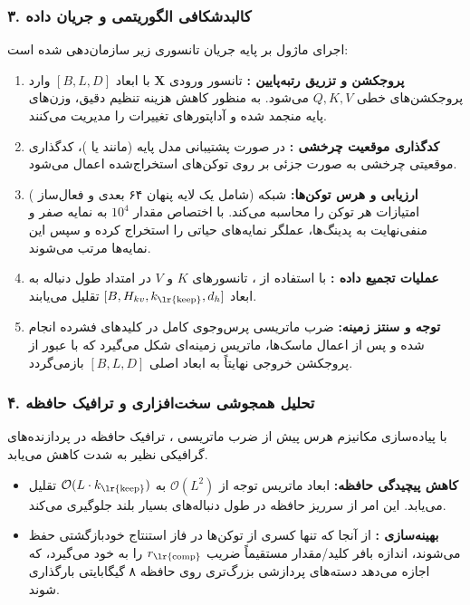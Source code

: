 \subsubsection*{۳. کالبدشکافی الگوریتمی و جریان داده }
اجرای ماژول  بر پایه جریان تانسوری زیر سازمان‌دهی شده است:
\begin{enumerate}
    \item \textbf{پروجکشن و تزریق رتبه‌پایین :} تانسور ورودی $\mathbf{X}$ با ابعاد $[B, L, D]$ وارد پروجکشن‌های خطی $Q, K, V$ می‌شود. به منظور کاهش هزینه تنظیم دقیق، وزن‌های پایه منجمد شده و آداپتورهای  تغییرات را مدیریت می‌کنند.
    \item \textbf{کدگذاری موقعیت چرخشی :} در صورت پشتیبانی مدل پایه (مانند  یا )، کدگذاری موقعیتی چرخشی به صورت جزئی بر روی توکن‌های استخراج‌شده اعمال می‌شود.
    \item \textbf{ارزیابی و هرس توکن‌ها:} شبکه  (شامل یک لایه پنهان ۶۴ بعدی و فعال‌ساز ) امتیازات هر توکن را محاسبه می‌کند. با اختصاص مقدار $10^4$ به نمایه صفر و منفی‌نهایت به پدینگ‌ها، عملگر  نمایه‌های حیاتی را استخراج کرده و سپس این نمایه‌ها مرتب می‌شوند.
    \item \textbf{عملیات تجميع داده :} با استفاده از ، تانسورهای $K$ و $V$ در امتداد طول دنباله به ابعاد $[B, H_{kv}, k_{\text{\lr{keep}}}, d_h]$ تقلیل می‌یابند.
    \item \textbf{توجه و سنتز زمینه:} ضرب ماتریسی پرس‌وجوی کامل در کلیدهای فشرده انجام شده و پس از اعمال ماسک‌ها، ماتریس زمینه‌ای شکل می‌گیرد که با عبور از پروجکشن خروجی نهایتاً به ابعاد اصلی $[B, L, D]$ بازمی‌گردد.
\end{enumerate}

\subsubsection*{۴. تحلیل همجوشی سخت‌افزاری و ترافیک حافظه }
با پیاده‌سازی مکانیزم هرس پیش از ضرب ماتریسی ، ترافیک حافظه  در پردازنده‌های گرافیکی نظیر  به شدت کاهش می‌یابد. 
\begin{itemize}
    \item \textbf{کاهش پیچیدگی حافظه:} ابعاد ماتریس توجه از $\mathcal{O}(L^2)$ به $\mathcal{O}(L \cdot k_{\text{\lr{keep}}})$ تقلیل می‌یابد. این امر از سرریز حافظه  در طول دنباله‌های بسیار بلند جلوگیری می‌کند.
    \item \textbf{بهینه‌سازی :} از آنجا که تنها کسری از توکن‌ها در فاز استنتاج خودبازگشتی حفظ می‌شوند، اندازه بافر کلید/مقدار مستقیماً ضریب $r_{\text{\lr{comp}}}$ را به خود می‌گیرد، که اجازه می‌دهد دسته‌های پردازشی بزرگ‌تری  روی حافظه ۸ گیگابایتی بارگذاری شوند.
\end{itemize}

